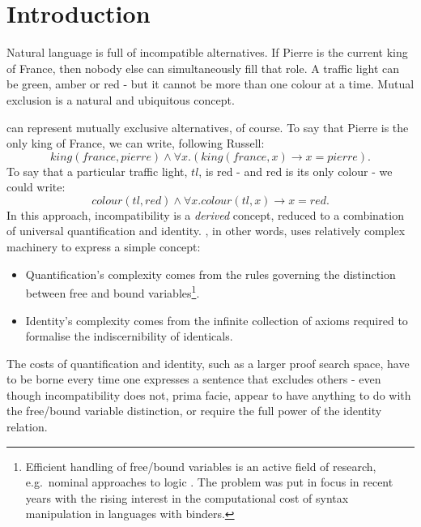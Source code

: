 \section{Introduction}\label{introduction}

Natural language is full of incompatible alternatives.
If Pierre is the current king of France, then nobody else can simultaneously fill that role.
A traffic light can be green, amber or red - but it cannot be more than one colour at a time.
Mutual exclusion is a natural and ubiquitous concept.

\FOL{} can represent mutually exclusive alternatives, of course.
To say that Pierre is the only king of France, we can write, following Russell:
\[
king(france, pierre) \land \forall x . (king(france, x) \rightarrow x = pierre).
\]
To say that a particular traffic light, $tl$, is red - and red is its only colour - we could write:
\[
colour(tl, red) \land \forall x . colour(tl, x) \rightarrow x = red.
\]
In this approach, incompatibility is a \emph{derived} concept, reduced to 
a combination of universal quantification and identity.  
\FOL{}, in other words, uses relatively complex machinery to express a
simple concept:
\begin{itemize}

\item Quantification's complexity comes from the
  rules governing the distinction between free
  and bound variables\footnote{Efficient handling of free/bound variables
    is an active field of research, e.g.~nominal approaches to logic
    \cite{PittsAM:nomsetnasics}.
    The problem was put in focus in recent years with the rising
     interest in the computational cost of syntax manipulation in
     languages with binders.}.

\item Identity's complexity comes from the infinite collection of axioms required to formalise the
  indiscernibility of identicals.

\end{itemize}

\NI The costs of quantification and identity, such as a larger proof
search space, have to be borne every time one expresses a sentence that excludes others - even
though incompatibility does not, prima facie, appear to have anything to do
with the free/bound variable distinction, or require the full power of 
the identity relation.

